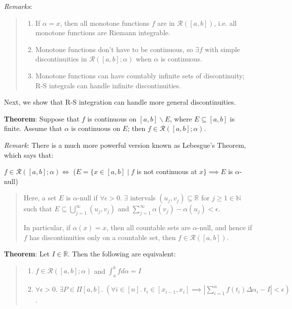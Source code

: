 \documentclass[11pt]{article}
\begin{document}
\emph{Remarks}:
\begin{quote}\vspace{-0.3cm}
	\begin{enumerate}
	\item If $\alpha = x$, then all monotone functions $f$ are in $\mathcal{R}([a,b])$, i.e. all monotone functions are Riemann integrable.
	\item Monotone functions don't have to be continuous, so $\exists f$ with simple discontinuities in $\mathcal{R}([a,b]; \alpha)$ when $\alpha$ is continuous.
	\item Monotone functions can have countably infinite sets of discontinuity; R-S integrals can handle infinite discontinuities.
	\end{enumerate}
\end{quote}

Next, we show that R-S integration can handle more general discontinuities.

\textbf{Theorem}: Suppose that $f$ is continuous on $[a,b] \backslash E$, where $E \subseteq [a,b]$ is finite. Assume that $\alpha$ is continuous on $E$; then $f \in \mathcal{R}([a,b]; \alpha)$.

\emph{Remark}: There is a much more powerful version known as Lebesgue's Theorem, which says that:
\begin{center}
$f \in \mathcal{R}([a,b]; \alpha) \iff$ ($E = \{x \in [a,b] \mid f$ is not continuous at $x\} \implies E$ is $\alpha$-null)
\end{center}
\begin{quote}
Here, a set $E$ is $\alpha$-null if $\forall \epsilon > 0.\; \exists$ intervals $(u_j, v_j) \subseteq \mathbb{R}$ for $j \geq 1 \in \mathbb{N}$ such that $E \subseteq \bigcup_{j=1}^\infty (u_j, v_j)$ and $\sum_{j=1}^\infty \alpha(v_j) - \alpha(u_j) < \epsilon$.

In particular, if $\alpha(x) = x$, then all countable sets are $\alpha$-null, and hence if $f$ has discontinuities only on a countable set, then $f \in \mathcal{R}([a,b])$.
\end{quote}

\textbf{Theorem}: Let $I \in \mathbb{R}$. Then the following are equivalent:
\begin{quote}\vspace{-0.3cm}
	\begin{enumerate}
	\item $f \in \mathcal{R}([a,b]; \alpha)$ and $\int_a^b f d\alpha = I$
	\item $\forall \epsilon > 0.\; \exists P \in \Pi[a,b].\; (\forall i \in [n].\; t_i \in [x_{i-1}, x_i] \implies |\sum_{i=1}^n f(t_i) \Delta \alpha_i - I| < \epsilon)$.
	\end{enumerate}
\end{quote}
\end{document}
